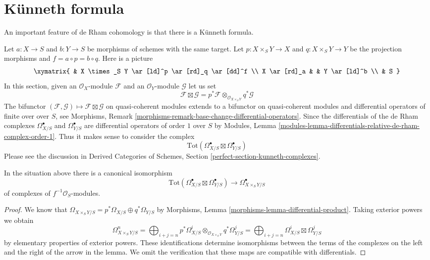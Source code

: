 \section{K\"unneth formula}
\label{section-kunneth}

\noindent
An important feature of de Rham cohomology is that there is a
K\"unneth formula.

\medskip\noindent
Let $a : X \to S$ and $b : Y \to S$ be morphisms of schemes with the same
target. Let $p : X \times_S Y \to X$ and $q : X \times_S Y \to Y$ be the
projection morphisms and $f = a \circ p = b \circ q$. Here is a picture
$$
\xymatrix{
& X \times_S Y \ar[ld]^p \ar[rd]_q \ar[dd]^f \\
X \ar[rd]_a & & Y \ar[ld]^b \\
& S
}
$$
In this section, given an $\mathcal{O}_X$-module $\mathcal{F}$
and an $\mathcal{O}_Y$-module $\mathcal{G}$ let us set
$$
\mathcal{F} \boxtimes \mathcal{G} =
p^*\mathcal{F} \otimes_{\mathcal{O}_{X \times_S Y}} q^*\mathcal{G}
$$
The bifunctor
$(\mathcal{F}, \mathcal{G}) \mapsto \mathcal{F} \boxtimes \mathcal{G}$
on quasi-coherent modules extends to a bifunctor on quasi-coherent modules
and differential operators of finite over over $S$, see
Morphisms, Remark \ref{morphisms-remark-base-change-differential-operators}.
Since the differentials of the de Rham complexes $\Omega^\bullet_{X/S}$ and
$\Omega^\bullet_{Y/S}$ are differential operators of order $1$
over $S$ by Modules, Lemma
\ref{modules-lemma-differentials-relative-de-rham-complex-order-1}.
Thus it makes sense to consider the complex
$$
\text{Tot}(\Omega^\bullet_{X/S} \boxtimes \Omega^\bullet_{Y/S})
$$
Please see the discussion in Derived Categories of Schemes, Section
\ref{perfect-section-kunneth-complexes}.

\begin{lemma}
\label{lemma-de-rham-complex-product}
In the situation above there is a canonical isomorphism
$$
\text{Tot}(\Omega^\bullet_{X/S} \boxtimes \Omega^\bullet_{Y/S})
\longrightarrow
\Omega^\bullet_{X \times_S Y/S}
$$
of complexes of $f^{-1}\mathcal{O}_S$-modules.
\end{lemma}

\begin{proof}
We know that
$
\Omega_{X \times_S Y/S} = p^*\Omega_{X/S} \oplus q^*\Omega_{Y/S}
$
by Morphisms, Lemma \ref{morphisms-lemma-differential-product}.
Taking exterior powers we obtain
$$
\Omega^n_{X \times_S Y/S} =
\bigoplus\nolimits_{i + j = n}
p^*\Omega^i_{X/S} \otimes_{\mathcal{O}_{X \times_S Y}} q^*\Omega^j_{Y/S} =
\bigoplus\nolimits_{i + j = n}
\Omega^i_{X/S} \boxtimes \Omega^j_{Y/S}
$$
by elementary properties of exterior powers. These identifications determine
isomorphisms between the terms of the complexes on the left and the right
of the arrow in the lemma. We omit the verification that these maps
are compatible with differentials.
\end{proof}

